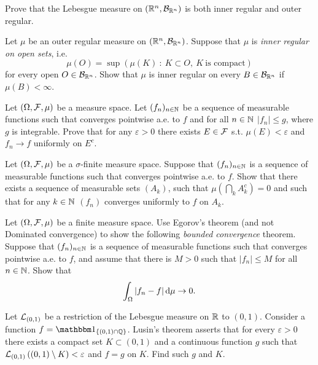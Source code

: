 \begin{problem}
Prove that the Lebesgue measure on $(\mathbb R^n, \mathcal B_{\mathbb R^n})$ is both inner regular and outer regular.
\end{problem}

\begin{problem}
Let $\mu$ be an outer regular measure on $(\mathbb R^n, \mathcal B_{\mathbb R^n})$. Suppose that $\mu$ is \textit{inner regular on open sets}, i.e. 
$$
    \mu(O) = \sup \left( \mu(K) ~ : ~ K \subset O, ~ K ~ \text{is compact} \right)
$$
for every open $O \in \mathcal B_{\mathbb R^n}$. Show that $\mu$ is inner regular on every $B \in \mathcal B_{\mathbb R^n}$ if $\mu(B) < \infty$.
\end{problem}

\begin{problem} Let $(\Omega, \mathcal F, \mu)$ be a measure space.
Let $(f_n)_{n\in\mathbb N}$ be a sequence of measurable functions such that converges pointwise a.e. to $f$ and for all $n\in\mathbb N$ $|f_n| \leq g$, where $g$ is integrable.
 Prove that for any $\varepsilon > 0$ there exists $E\in\mathcal F$ s.t. $\mu(E) < \varepsilon$ and $f_n \to f$ uniformly on $E^c$.
\end{problem}

\begin{problem} Let $(\Omega, \mathcal F, \mu)$ be a $\sigma$-finite measure space.
Suppose that $(f_n)_{n\in\mathbb N}$ is a sequence of measurable functions such that converges pointwise a.e. to $f$.
Show that there exists a sequence of measurable sets $(A_k)$, such that $\mu \left( \bigcap_k A_k^c \right) = 0$ and such that for any $k\in\mathbb N$ $(f_n)$ converges uniformly to $f$ on $A_k$.
\end{problem}

\begin{problem} Let $(\Omega, \mathcal F, \mu)$ be a finite measure space. Use Egorov's theorem (and not Dominated convergence) to show the following \emph{bounded convergence} theorem. 
Suppose that $(f_n)_{n\in\mathbb N}$ is a sequence of measurable functions such that converges pointwise a.e. to $f$, and assume that there is $M>0$ such that $|f_n|\leq M$ for all $n\in \mathbb N$. Show that 
\begin{equation*}
    \int_\Omega|f_n-f|\,\mathrm{d} \mu \to 0.
\end{equation*}
    
\end{problem}

\begin{problem}
Let $\mathcal L_{(0, 1)}$ be a restriction of the Lebesgue measure on $\mathbb R$ to $(0, 1)$. Consider a function $f = \ind{(0,1)\cap \bbQ}$. Lusin's theorem asserts that for every $\varepsilon > 0$ there exists a compact set $K \subset (0, 1)$ and a continuous function $g$ such that $\mathcal L_{(0, 1)} \left( (0, 1) \setminus K \right) < \varepsilon$ and $f = g$ on $K$. Find such $g$ and $K$.
\end{problem}
